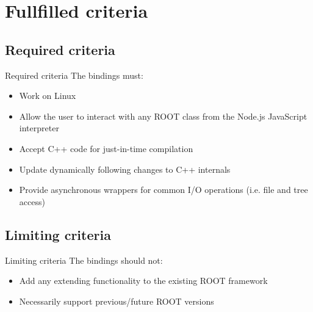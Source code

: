\section{Fullfilled criteria}

\subsection{Required criteria}
\begin{frame}{Required criteria}
    The bindings must:
     \begin{itemize}
		\item Work on Linux \uncover<2->{\checkmark}
        \item Allow the user to interact with any ROOT class from the Node.js JavaScript interpreter 
        \item Accept C++ code for just-in-time compilation 
        \item Update dynamically following changes to C++ internals 
        \item Provide asynchronous wrappers for common I/O operations (i.e. file and tree access) 
     \end{itemize}
\end{frame}


\subsection{Limiting criteria}
\begin{frame}{Limiting criteria}
    The bindings should not:
    \begin{itemize}
        \item Add any extending functionality to the existing ROOT framework 
        \item Necessarily support previous/future ROOT versions 
    \end{itemize}
\end{frame}
